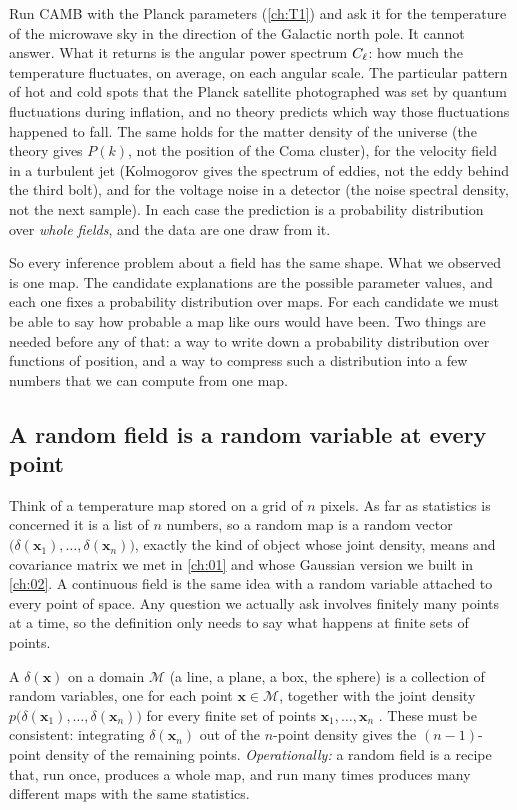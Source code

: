 Run CAMB with the Planck parameters (\cref{ch:T1}) and ask it for the
temperature of the microwave sky in the direction of the Galactic north pole. It
cannot answer. What it returns is the angular power spectrum $C_\ell$: how much
the temperature fluctuates, on average, on each angular scale. The particular
pattern of hot and cold spots that the Planck satellite photographed was set by
quantum fluctuations during inflation, and no theory predicts which way those
fluctuations happened to fall. The same holds for the matter density of the
universe (the theory gives $P(k)$, not the position of the Coma cluster), for the
velocity field in a turbulent jet (Kolmogorov gives the spectrum of eddies, not
the eddy behind the third bolt), and for the voltage noise in a detector (the
noise spectral density, not the next sample). In each case the prediction is a
probability distribution over \emph{whole fields}, and the data are one draw
from it.

So every inference problem about a field has the same shape. What we observed is
one map. The candidate explanations are the possible parameter values, and each
one fixes a probability distribution over maps. For each candidate we must be
able to say how probable a map like ours would have been. Two things are needed
before any of that: a way to write down a probability distribution over
functions of position, and a way to compress such a distribution into a few
numbers that we can compute from one map.

\subsection{A random field is a random variable at every point}
\label{7a:sec:def}

Think of a temperature map stored on a grid of $n$ pixels. As far as statistics is
concerned it is a list of $n$ numbers, so a random map is a random vector
$\bigl(\delta(\bm x_1),\dots,\delta(\bm x_n)\bigr)$, exactly the kind of object
whose joint density, means and covariance matrix we met in \cref{ch:01} and whose
Gaussian version we built in \cref{ch:02}. A continuous field is the same idea
with a random variable attached to every point of space. Any question we
actually ask involves finitely many points at a time, so the definition only
needs to say what happens at finite sets of points.

\begin{workdef}
A  $\delta(\bm x)$ on a domain $\mathcal M$ (a line, a
plane, a box, the sphere) is a collection of random variables, one for each point
$\bm x\in\mathcal M$, together with the joint density
$p\bigl(\delta(\bm x_1),\dots,\delta(\bm x_n)\bigr)$ for every finite set of
points $\bm x_1,\dots,\bm x_n$ . These must be
consistent: integrating $\delta(\bm x_n)$ out of the $n$-point density gives the
$(n-1)$-point density of the remaining points.
\emph{Operationally:} a random field is a recipe that, run once, produces a
whole map, and run many times produces many different maps with the same
statistics.
\end{workdef}

